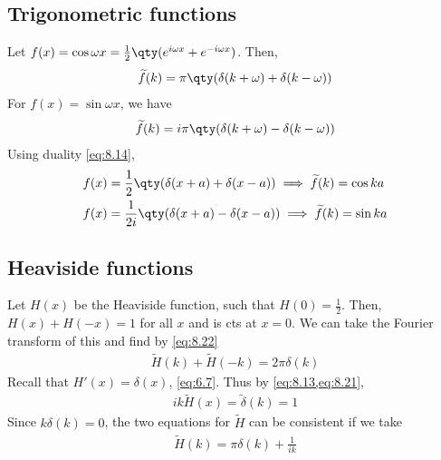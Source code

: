 \subsection{Trigonometric functions}
Let $f(x) = \cos \omega x = \frac{1}{2} \qty(e^{i\omega x} + e^{-i \omega x})$.
Then,
\begin{align} \label{eq:8.24}
	\widetilde f(k) = \pi\qty(\delta(k+\omega) + \delta(k-\omega))
\end{align}
For $f(x) = \sin \omega x$, we have
\begin{align*}
	\widetilde f(k) = i\pi\qty(\delta(k+\omega) - \delta(k-\omega))
\end{align*}
Using duality \cref{eq:8.14},
\begin{align*}
	f(x) & = \frac{1}{2}\qty(\delta(x+a) + \delta(x-a)) \implies \widetilde f(k) = \cos ka  \\
	f(x) & = \frac{1}{2i}\qty(\delta(x+a) - \delta(x-a)) \implies \widetilde f(k) = \sin ka
\end{align*}

\subsection{Heaviside functions}
Let $H(x)$ be the Heaviside function, such that $H(0) = \frac{1}{2}$.
Then, $H(x) + H(-x) = 1$ for all $x$ and is cts at $x = 0$.
We can take the Fourier transform of this and find by \cref{eq:8.22}
\begin{align*}
	\widetilde H(k) + \widetilde H(-k) = 2\pi \delta(k) \tag{$\ast$}
\end{align*}
Recall that $H'(x) = \delta(x)$, \cref{eq:6.7}.
Thus by \cref{eq:8.13,eq:8.21},
\begin{align*}
	ik \widetilde H(x) = \widetilde \delta(k) = 1 \tag{$\dagger$}
\end{align*}
Since $k \delta(k) = 0$, the two equations for $\widetilde H$ can be consistent if we take
\begin{align} \label{eq:8.25}
	\widetilde H(k) = \pi\delta(k) + \frac{1}{ik}
\end{align}

